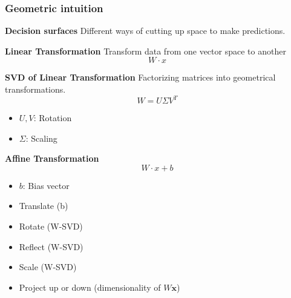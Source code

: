 \documentclass{article}
\begin{document}
\subsubsection{Geometric intuition}
\begin{notes} \textbf{Decision surfaces}
    Different ways of cutting up space to make predictions.
\end{notes}

\begin{notes} \textbf{Linear Transformation}
    Transform data from one vector space to another
    \begin{equation}
        W \cdot x 
    \end{equation}
\end{notes}

\begin{notes} \textbf{SVD of Linear Transformation} 
    Factorizing matrices into geometrical transformations.
    \begin{equation}
        W = U \Sigma V^T
    \end{equation}
    \begin{itemize}
        \item $U,V$: Rotation
        \item $\Sigma$: Scaling
    \end{itemize}
\end{notes}

\begin{notes} \textbf{Affine Transformation}
    \begin{equation}
        W \cdot x + b
    \end{equation}
    \begin{itemize}
        \item $b$: Bias vector
    \end{itemize}
    \vspace{1em}

    \begin{itemize}
        \item Translate (b)
        \item Rotate (W-SVD)
        \item Reflect (W-SVD)
        \item Scale (W-SVD)
        \item Project up or down (dimensionality of $W \mathbf{x}$)
    \end{itemize}
\end{notes}
\end{document}
